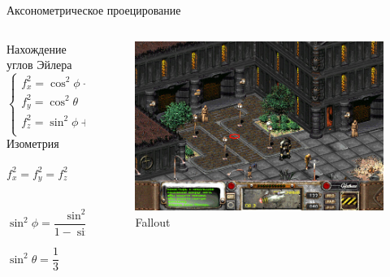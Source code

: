 \documentclass{beamer}
\begin{document}
	\begin{frame}{Аксонометрическое проецирование}

		\begin{columns}
			\begin{column}{0.45\textwidth}
				Нахождение углов Эйлера
		\[
			\begin{cases}
				f_x^2 = \cos^2 \phi + \sin^2 \phi \sin^2 \theta \\
				f_y^2 = \cos^2 \theta \\
				f_z^2 = \sin^2 \phi + \cos^2 \phi \sin^2 \theta \\
			\end{cases}	
		\]
		Изометрия
		\[
			f_x^2 = f_y^2 = f_z^2
			\qquad
			\begin{cases}
				f_x^2 = f_y^2  \\
				f_y^2 = f_z^2 \\
			\end{cases}	
		\]

		\[
			\sin^2 \phi  = \frac{\sin^2 \theta}{1 - \sin^2 \theta}
		\]


		\[
			\sin^2 \theta  = \frac{1}{3}
			\qquad
			\sin^2 \phi  = \frac{1}{2}
		\]

	\end{column}
	\begin{column}{0.55\textwidth}
		\begin{figure} 
				\includegraphics[width=\textwidth]{images/fallout_2.jpg}
			\caption{Fallout}
		\end{figure}
	\end{column}
\end{columns}

		\note{
			{ \tiny
			\[
				\cos^2 \phi + \sin^2 \phi \sin^2 \theta = cos^2 \theta
			\]
			\[
				(1 - \sin^2 \phi) + \sin^2 \phi \sin^2 \theta = (1 - \sin^2 \theta)
			\]

}}
\end{frame}
\end{document}
